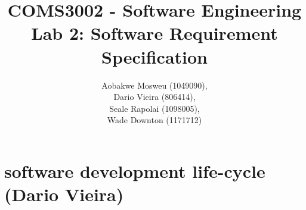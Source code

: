 \documentclass[11pt]{article}
\begin{document}
	\title{%
		COMS3002 - Software Engineering\\
		\large Lab 2: Software Requirement Specification
	}
	\author{Aobakwe Mosweu (1049090), \\Dario Vieira (806414), \\Seale Rapolai (1098005), \\Wade Downton (1171712)}
	\maketitle
	
	\clearpage
	\tableofcontents
	\clearpage
	
	\section{software development life-cycle (Dario Vieira)}
\end{document}
